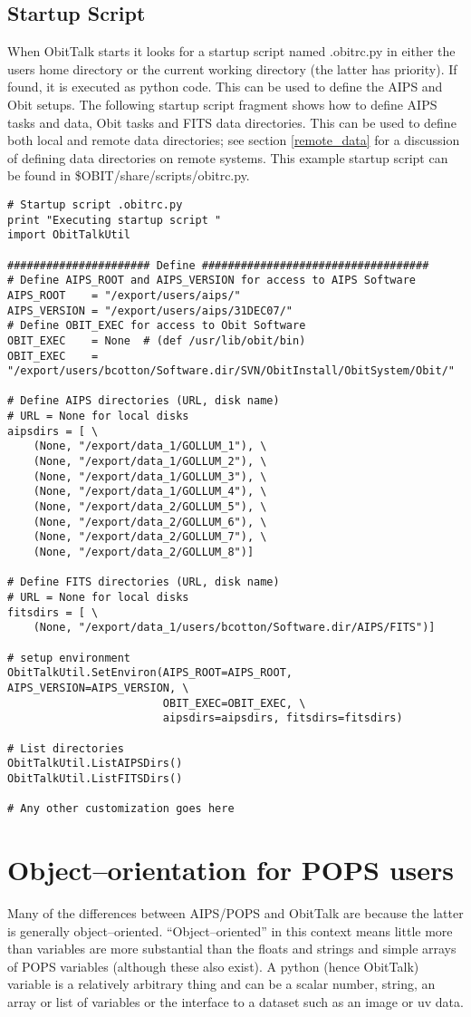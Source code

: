 \documentclass[11pt]{report}
\begin{document}
\subsection{Startup Script}
When ObitTalk starts it looks for a startup script named .obitrc.py in
either the users home directory or the current working directory (the
latter has priority).
If found, it is executed as python code.
This can be used to define the AIPS and Obit setups.
The following startup script fragment shows how to define AIPS tasks
and data, Obit tasks and FITS data directories.
This can be used to define both local and remote data directories; see
section \ref{remote_data} for a discussion of defining data
directories on remote systems.
This example startup script can be found in \$OBIT/share/scripts/obitrc.py.
\begin{verbatim}
# Startup script .obitrc.py
print "Executing startup script "
import ObitTalkUtil

###################### Define ###################################
# Define AIPS_ROOT and AIPS_VERSION for access to AIPS Software
AIPS_ROOT    = "/export/users/aips/"
AIPS_VERSION = "/export/users/aips/31DEC07/"
# Define OBIT_EXEC for access to Obit Software 
OBIT_EXEC    = None  # (def /usr/lib/obit/bin)
OBIT_EXEC    = "/export/users/bcotton/Software.dir/SVN/ObitInstall/ObitSystem/Obit/"

# Define AIPS directories (URL, disk name)
# URL = None for local disks
aipsdirs = [ \
    (None, "/export/data_1/GOLLUM_1"), \
    (None, "/export/data_1/GOLLUM_2"), \
    (None, "/export/data_1/GOLLUM_3"), \
    (None, "/export/data_1/GOLLUM_4"), \
    (None, "/export/data_2/GOLLUM_5"), \
    (None, "/export/data_2/GOLLUM_6"), \
    (None, "/export/data_2/GOLLUM_7"), \
    (None, "/export/data_2/GOLLUM_8")]

# Define FITS directories (URL, disk name)
# URL = None for local disks
fitsdirs = [ \
    (None, "/export/data_1/users/bcotton/Software.dir/AIPS/FITS")]

# setup environment
ObitTalkUtil.SetEnviron(AIPS_ROOT=AIPS_ROOT, AIPS_VERSION=AIPS_VERSION, \
                        OBIT_EXEC=OBIT_EXEC, \
                        aipsdirs=aipsdirs, fitsdirs=fitsdirs)

# List directories
ObitTalkUtil.ListAIPSDirs()
ObitTalkUtil.ListFITSDirs()

# Any other customization goes here
\end{verbatim}

\section {Object--orientation for POPS users}
Many of the differences between AIPS/POPS and ObitTalk are because the
latter is generally object--oriented.
``Object--oriented'' in this context means little more than variables
are more substantial than the floats and strings and simple arrays of
POPS variables (although these also exist).
A python (hence ObitTalk) variable is a relatively arbitrary thing and
can be a scalar number, string, an array or list of variables or the
interface to a dataset such as an image or uv data.
\end{document}
